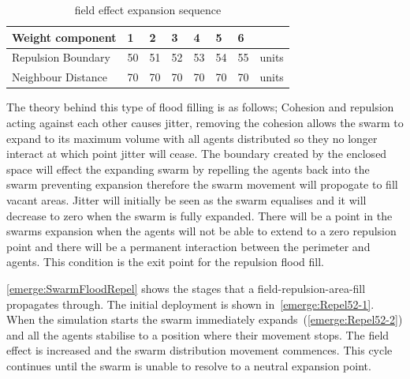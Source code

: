 \begin{table}[H]
\begin{center}
\begin{tabular}{| p{2cm} | p{0.6cm} | p{0.6cm} | p{0.6cm} | p{0.6cm} | p{0.6cm} | p{0.6cm} | p{1cm} |}
\hline
\bf Weight \bf component & \bf 1 & \bf 2 & \bf 3 & \bf 4 & \bf 5 & \bf 6 & \\ \hline
Repulsion Boundary & 50 & 51 & 52 & 53 & 54 & 55 & units\\  \hline
Neighbour Distance & 70 & 70 & 70 & 70 & 70 & 70 & units\\  \hline
\end{tabular}\caption{field effect expansion sequence} \label{tab:emerge:BaselineConcaveReduction}
\end{center}
\end{table}

The theory behind this type of flood filling is as follows; Cohesion and repulsion acting against each other causes jitter, removing the cohesion allows the swarm to expand to its maximum volume with all agents distributed so they no longer interact at which point jitter will cease. The boundary created by the enclosed space will effect the expanding swarm by repelling the agents back into the swarm preventing expansion therefore the swarm movement will propogate to fill vacant areas. Jitter will initially be seen as the swarm equalises and it will decrease to zero when the swarm is fully expanded. There will be a point in the swarms expansion when the agents will not be able to extend to a zero repulsion point and there will be a permanent interaction between the perimeter and agents. This condition is the exit point for the repulsion flood fill.

\autoref{emerge:SwarmFloodRepel} shows the stages that a field-repulsion-area-fill propagates through. The initial deployment is shown in~\autoref{emerge:Repel52-1}. When the simulation starts the swarm immediately expands~(\autoref{emerge:Repel52-2}) and all the agents stabilise to a position where their movement stops. The field effect is increased and the swarm distribution movement commences. This cycle continues until the swarm is unable to resolve to a neutral expansion point.

